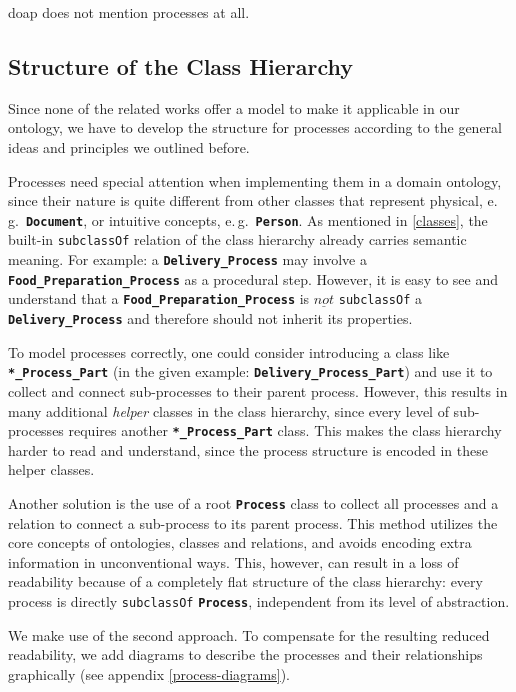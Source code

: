 \documentclass[a4paper, DIV=13, BCOR=0cm]{scrbook}
\newcommand{\eg}{e.\,g.\ }
\newcommand{\class}[1]{\texttt{\textbf{#1}}}
\newcommand{\relation}[1]{\texttt{#1}}
\begin{document}
\gls{doap} does not mention processes at all.

\subsection{Structure of the Class Hierarchy}
\label{process-subclass}
Since none of the related works offer a model to make it applicable in our ontology, we have to develop the structure for processes according to the general ideas and principles we outlined before.

Processes need special attention when implementing them in a domain ontology, since their nature is quite different from other classes that represent physical, \eg \class{Document}, or intuitive concepts, \eg \class{Person}. As mentioned in \autoref{classes}, the built-in \relation{subclassOf} relation of the class hierarchy already carries semantic meaning. For example: a \class{Delivery\_Process} may involve a \class{Food\_Preparation\_Process} as a procedural step. However, it is easy to see and understand that a \class{Food\_Preparation\_Process} is $\underline{not}$ \relation{subclassOf} a \class{Delivery\_Process} and therefore should not inherit its properties.

To model processes correctly, one could consider introducing a class like \class{*\_Process\_Part} (in the given example: \class{Delivery\_Process\_Part}) and use it to collect and connect sub-processes to their parent process. However, this results in many additional \textit{helper} classes in the class hierarchy, since every level of sub-processes requires another \class{*\_Process\_Part} class. This makes the class hierarchy harder to read and understand, since the process structure is encoded in these helper classes.

Another solution is the use of a root \class{Process} class to collect all processes and a relation to connect a sub-process to its parent process. This method utilizes the core concepts of ontologies, classes and relations, and avoids encoding extra information in unconventional ways. This, however, can result in a loss of readability because of a completely flat structure of the class hierarchy: every process is directly \relation{subclassOf} \class{Process}, independent from its level of abstraction.

We make use of the second approach. To compensate for the resulting reduced readability, we add diagrams to describe the processes and their relationships graphically (see appendix \ref{process-diagrams}).
\end{document}
